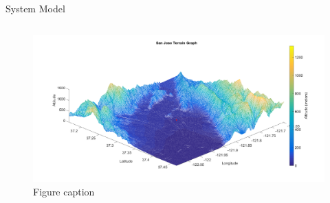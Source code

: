 \documentclass[final]{beamer}
\newlength{\onecolwid}
\newlength{\twocolwid}
\begin{document}
\begin{frame}[t]
\begin{columns}[t]
\begin{column}{\twocolwid}
\begin{columns}[t,totalwidth=\twocolwid]
\begin{column}{\onecolwid}
\begin{block}{System Model}
\end{block}


%
%
%
%
%


\end{column} %

\end{columns} %




\begin{figure}
\includegraphics[width=1\linewidth]{terrain-side.png}
\caption{Figure caption}
\end{figure}





\end{column}
\end{columns}
\end{frame}
\end{document}
